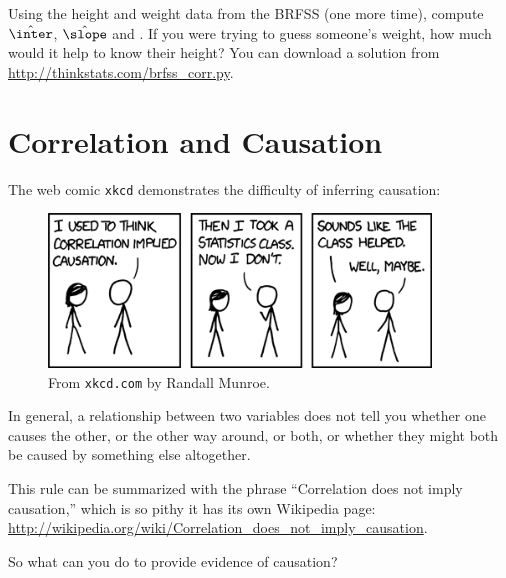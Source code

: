 \documentclass[12pt]{book}
\begin{document}
\begin{exercise}
Using the height and weight data from the BRFSS (one more time),
compute $\hat{\inter}$, $\hat{\slope}$ and \R{}.  If you were trying to guess
someone's weight, how much would it help to know their height?
You can download a solution from
\url{http://thinkstats.com/brfss_corr.py}.

\end{exercise}


\section{Correlation and Causation}

The web comic {\tt xkcd} demonstrates the difficulty of inferring
causation:

\begin{figure}
\centerline{\includegraphics[width=4.0in]{figs/correlation.png}}
\caption{From {\tt xkcd.com} by Randall Munroe.}
\end{figure}

In general, a relationship between two variables does not tell you
whether one causes the other, or the other way around, or both, or
whether they might both be caused by something else altogether.

This rule can be summarized with the phrase ``Correlation
does not imply causation,'' which is so pithy it has its own
Wikipedia page: \url{http://wikipedia.org/wiki/Correlation_does_not_imply_causation}.

So what can you do to provide evidence of causation?
\end{document}
